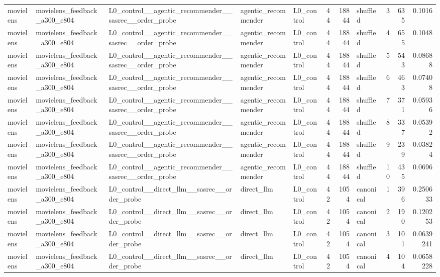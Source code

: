 \begin{table}[htbp!]
\begin{tabular}{lllllrrlrrr}
movielens & movielens\_feedback\_a300\_e804 & L0\_control\_\_agentic\_recommender\_\_sasrec\_\_order\_probe & agentic\_recommender & L0\_control & 44 & 18844 & shuffled & 3 & 635 & 0.1016 \\
movielens & movielens\_feedback\_a300\_e804 & L0\_control\_\_agentic\_recommender\_\_sasrec\_\_order\_probe & agentic\_recommender & L0\_control & 44 & 18844 & shuffled & 4 & 655 & 0.1048 \\
movielens & movielens\_feedback\_a300\_e804 & L0\_control\_\_agentic\_recommender\_\_sasrec\_\_order\_probe & agentic\_recommender & L0\_control & 44 & 18844 & shuffled & 5 & 543 & 0.08688 \\
movielens & movielens\_feedback\_a300\_e804 & L0\_control\_\_agentic\_recommender\_\_sasrec\_\_order\_probe & agentic\_recommender & L0\_control & 44 & 18844 & shuffled & 6 & 463 & 0.07408 \\
movielens & movielens\_feedback\_a300\_e804 & L0\_control\_\_agentic\_recommender\_\_sasrec\_\_order\_probe & agentic\_recommender & L0\_control & 44 & 18844 & shuffled & 7 & 371 & 0.05936 \\
movielens & movielens\_feedback\_a300\_e804 & L0\_control\_\_agentic\_recommender\_\_sasrec\_\_order\_probe & agentic\_recommender & L0\_control & 44 & 18844 & shuffled & 8 & 337 & 0.05392 \\
movielens & movielens\_feedback\_a300\_e804 & L0\_control\_\_agentic\_recommender\_\_sasrec\_\_order\_probe & agentic\_recommender & L0\_control & 44 & 18844 & shuffled & 9 & 239 & 0.03824 \\
movielens & movielens\_feedback\_a300\_e804 & L0\_control\_\_agentic\_recommender\_\_sasrec\_\_order\_probe & agentic\_recommender & L0\_control & 44 & 18844 & shuffled & 10 & 435 & 0.0696 \\
movielens & movielens\_feedback\_a300\_e804 & L0\_control\_\_direct\_llm\_\_sasrec\_\_order\_probe & direct\_llm & L0\_control & 42 & 1054 & canonical & 1 & 396 & 0.250633 \\
movielens & movielens\_feedback\_a300\_e804 & L0\_control\_\_direct\_llm\_\_sasrec\_\_order\_probe & direct\_llm & L0\_control & 42 & 1054 & canonical & 2 & 190 & 0.120253 \\
movielens & movielens\_feedback\_a300\_e804 & L0\_control\_\_direct\_llm\_\_sasrec\_\_order\_probe & direct\_llm & L0\_control & 42 & 1054 & canonical & 3 & 101 & 0.0639241 \\
movielens & movielens\_feedback\_a300\_e804 & L0\_control\_\_direct\_llm\_\_sasrec\_\_order\_probe & direct\_llm & L0\_control & 42 & 1054 & canonical & 4 & 104 & 0.0658228 \\

\end{tabular}
\end{table}
